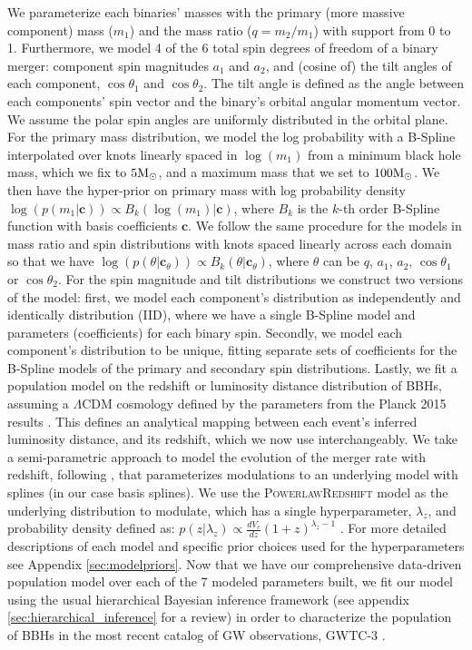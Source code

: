 We parameterize each binaries' masses with the primary (more massive component) mass ($m_1$) 
and the mass ratio ($q=m_2/m_1$) with support from 0 to 1. Furthermore, we model 4 of the 6 total 
spin degrees of freedom of a binary merger: component spin magnitudes $a_1$ and $a_2$, and (cosine of) the tilt angles of each component, $\cos{\theta_1}$ and $\cos{\theta_2}$. The tilt angle is defined as the angle between each components' spin vector and the binary's orbital angular momentum vector. 
We assume the polar spin angles are uniformly distributed in the orbital plane. For the primary mass distribution, we model the log probability with a B-Spline interpolated over 
knots linearly spaced in $\log(m_1)$ from a minimum black hole mass, which we fix to $5{\rm M}_\odot$, and a maximum mass 
that we set to $100{\rm M}_\odot$. We then have the hyper-prior on primary mass with log probability density 
$\log(p(m_1 | \bm{c})) \propto B_{k}(\log(m_1) | \bm{c})$, where $B_{k}$ is the 
$k$-th order B-Spline function with basis coefficients $\bm{c}$. We follow the same procedure 
for the models in mass ratio and spin distributions with knots spaced linearly across each domain 
so that we have $\log(p(\theta | \bm{c}_\theta)) \propto B_{k}(\theta | \bm{c}_\theta)$, 
where $\theta$ can be $q$, $a_1$, $a_2$, $\cos{\theta_1}$ or $\cos{\theta_2}$. 
For the spin magnitude and tilt distributions we construct two versions of the model: first, we model  
each component's distribution as independently and identically distribution (IID), 
where we have a single B-Spline model and parameters (coefficients) for each binary spin. 
Secondly, we model each component's distribution to be unique, fitting separate sets of coefficients for the B-Spline models of the primary and secondary spin distributions. 
Lastly, we fit a population model on the redshift or luminosity distance distribution of BBHs, assuming a $\Lambda\mathrm{CDM}$ cosmology defined by the parameters 
from the Planck 2015 results \citep{Planck2015}. This defines an analytical mapping between each event's inferred luminosity distance, and its redshift, which we now use interchangeably. 
We take a semi-parametric approach to model the evolution of the merger rate with redshift, following \citet{Edelman_2022ApJ}, that parameterizes modulations to an underlying model 
with splines (in our case basis splines). We use the \textsc{PowerlawRedshift} model as the underlying distribution to modulate, which has a single hyperparameter, $\lambda_z$, and 
probability density defined as: $p(z|\lambda_z)\propto \frac{dV_c}{dz}(1+z)^{\lambda_z-1}$ \citep{Fishbach_2018redshift}. For more detailed descriptions of each model and 
specific prior choices used for the hyperparameters see Appendix \ref{sec:modelpriors}. Now that we have our comprehensive data-driven population model over 
each of the 7 modeled parameters built, we fit our model using the usual hierarchical Bayesian inference framework (see appendix \ref{sec:hierarchical_inference} for a review) in order to characterize 
the population of BBHs in the most recent catalog of GW observations, GWTC-3 \citep{GWTC3,o3b_astro_dist}.